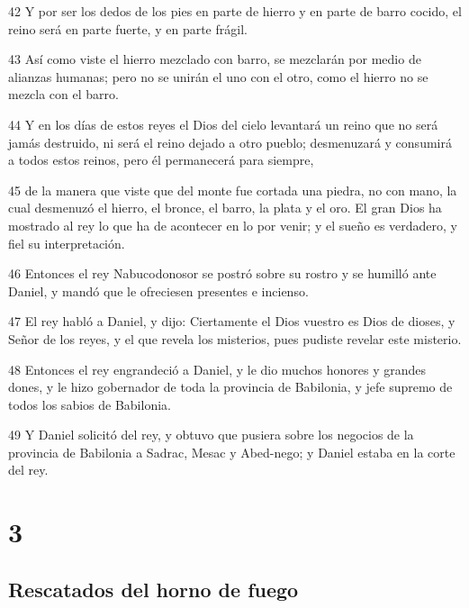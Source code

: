 \par 42 Y por ser los dedos de los pies en parte de hierro y en parte de barro cocido, el reino será en parte fuerte, y en parte frágil.
\par 43 Así como viste el hierro mezclado con barro, se mezclarán por medio de alianzas humanas; pero no se unirán el uno con el otro, como el hierro no se mezcla con el barro.
\par 44 Y en los días de estos reyes el Dios del cielo levantará un reino que no será jamás destruido, ni será el reino dejado a otro pueblo; desmenuzará y consumirá a todos estos reinos, pero él permanecerá para siempre,
\par 45 de la manera que viste que del monte fue cortada una piedra, no con mano, la cual desmenuzó el hierro, el bronce, el barro, la plata y el oro. El gran Dios ha mostrado al rey lo que ha de acontecer en lo por venir; y el sueño es verdadero, y fiel su interpretación.
\par 46 Entonces el rey Nabucodonosor se postró sobre su rostro y se humilló ante Daniel, y mandó que le ofreciesen presentes e incienso.
\par 47 El rey habló a Daniel, y dijo: Ciertamente el Dios vuestro es Dios de dioses, y Señor de los reyes, y el que revela los misterios, pues pudiste revelar este misterio.
\par 48 Entonces el rey engrandeció a Daniel, y le dio muchos honores y grandes dones, y le hizo gobernador de toda la provincia de Babilonia, y jefe supremo de todos los sabios de Babilonia.
\par 49 Y Daniel solicitó del rey, y obtuvo que pusiera sobre los negocios de la provincia de Babilonia a Sadrac, Mesac y Abed-nego; y Daniel estaba en la corte del rey.

\chapter{3}

\section*{Rescatados del horno de fuego}

